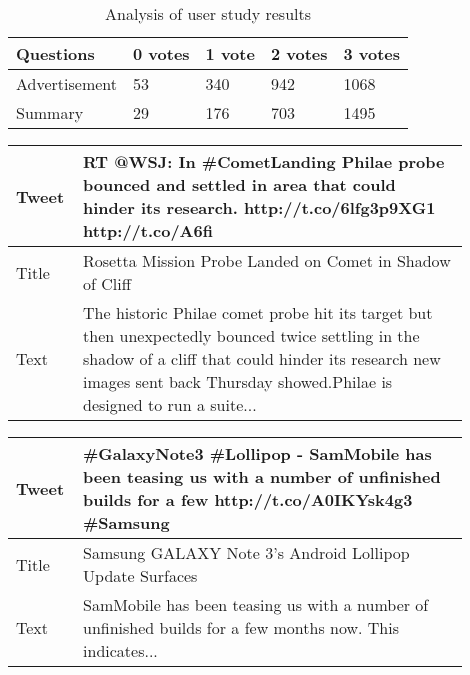 \begin{table}[!htbp]
\centering
\caption{Analysis of user study results}
\label{tab:yeses}
\begin{tabular}{|l|l|l|l|l|}
\hline
Questions     & 0 votes & 1 vote & 2 votes & 3 votes \\ \hline
Advertisement & 53    & 340    & 942     &  1068  \\ \hline
Summary       & 29     & 176    & 703     & 1495    \\ \hline
\end{tabular}
\end{table}


\begin{table}[!htbp]
\centering
\begin{tabular}{|p{0.1\linewidth}|p{0.8\linewidth}|}
\hline
Tweet &   RT @WSJ: In \#CometLanding Philae probe bounced and settled in area that could hinder its research. http://t.co/6lfg3p9XG1 http://t.co/A6fi  \\ \hline
Title &   Rosetta Mission Probe Landed on Comet in Shadow of Cliff	                                                                                 \\ \hline
Text  &  The historic Philae comet probe hit its target but then unexpectedly bounced twice settling in the shadow of a cliff that could hinder its research new images sent back Thursday showed.Philae is designed to run a suite...                                                                                         \\ \hline
\end{tabular}
\label{tab:exq1no}
\end{table}


\begin{table}[!htbp]
\centering
\begin{tabular}{|p{0.1\linewidth}|p{0.8\linewidth}|}
\hline
Tweet & \#GalaxyNote3 \#Lollipop - SamMobile has been teasing us with a number of unfinished builds for a few http://t.co/A0IKYsk4g3 \#Samsung \\ \hline
Title &   Samsung GALAXY Note 3's Android Lollipop Update Surfaces                                                                                 \\ \hline
Text  &  SamMobile has been teasing us with a number of unfinished builds for a few months now. This indicates...                                                                                         \\ \hline
\end{tabular}
\label{tab:exq1yes}
\end{table}


